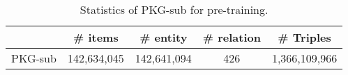 \begin{table}[!hbpt]
    \centering
    \caption{Statistics of PKG-sub for pre-training.}
    \begin{tabular}{ c | c |c|c | c}
    \toprule
           & \# items & \# entity & \# relation & \# Triples \\
           \midrule 
           PKG-sub &142,634,045 &142,641,094 &426 &1,366,109,966
 \\
        \bottomrule
    \end{tabular}
    \label{tab:dataset-pre-train}
\end{table}